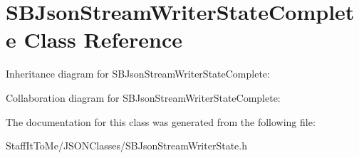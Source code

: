 \hypertarget{interface_s_b_json_stream_writer_state_complete}{
\section{\-S\-B\-Json\-Stream\-Writer\-State\-Complete \-Class \-Reference}
\label{interface_s_b_json_stream_writer_state_complete}
}


\-Inheritance diagram for \-S\-B\-Json\-Stream\-Writer\-State\-Complete\-:


\-Collaboration diagram for \-S\-B\-Json\-Stream\-Writer\-State\-Complete\-:


\-The documentation for this class was generated from the following file\-:\begin{DoxyCompactItemize}
\item 
\-Staff\-It\-To\-Me/\-J\-S\-O\-N\-Classes/\-S\-B\-Json\-Stream\-Writer\-State.\-h\end{DoxyCompactItemize}
